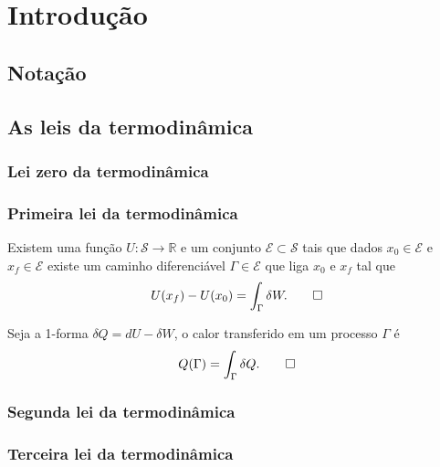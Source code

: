 \chapter{Introdução}

\section{Notação}

\section{As leis da termodinâmica}

\subsection{Lei zero da termodinâmica}
\subsection{Primeira lei da termodinâmica}

\begin{axioma}
   Existem uma função $U:\mathcal{S}\rightarrow\mathbb{R}$
   e um conjunto $\mathcal{E}\subset\mathcal{S}$ tais que
   dados $x_0\in\mathcal{E}$ e $x_f\in\mathcal{E}$
   existe um caminho diferenciável $\Gamma\in\mathcal{E}$
   que liga $x_0$ e $x_f$ tal que
   $$ U(x_f) - U(x_0) = \int_{\Gamma} \delta W. \qedhere $$
\end{axioma}

\lipsum[1]

\begin{definicao}
   Seja a 1-forma $\delta Q = dU - \delta W$,
   o calor transferido em um processo $\Gamma$ é
   $$ Q(\Gamma) = \int_{\Gamma} \delta Q. \qedhere $$
\end{definicao}

\lipsum[2]

\subsection{Segunda lei da termodinâmica}
\subsection{Terceira lei da termodinâmica}
